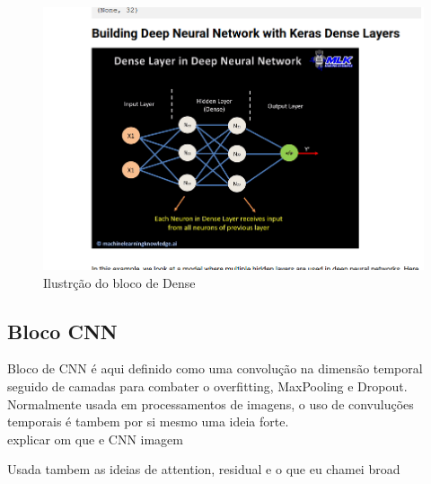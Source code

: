 \begin{figure}[H]
	\centering
	\includegraphics{Imagens/dense_block.png}
	\caption{Ilustrção do bloco de Dense}
\end{figure}

\subsection{Bloco CNN\label{se:cnn}}

Bloco de CNN é aqui definido como uma convolução na dimensão temporal seguido de camadas para combater o overfitting, MaxPooling e Dropout. \\
Normalmente usada em processamentos de imagens, o uso de convuluções temporais é tambem por si mesmo uma ideia forte. \\

explicar om que e CNN
imagem

Usada tambem as ideias de attention, residual e o que eu chamei broad

